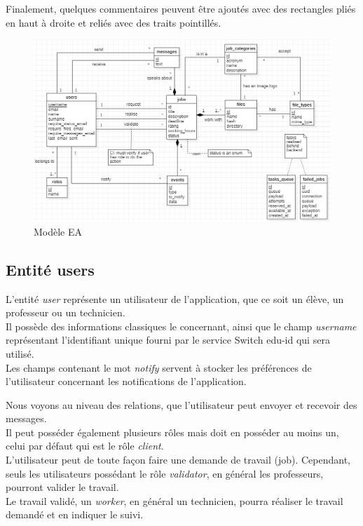 \documentclass[
    iai, %
    il, %
]{heig-tb}
\begin{document}
Finalement, quelques commentaires peuvent être ajoutés avec des rectangles pliés en haut à droite et reliés avec des traits pointillés.

\begin{center}
    \begin{figure}[H]
        \includegraphics[width=\textwidth]{./assets/figures/ea.png}
        \caption{Modèle EA \label{ea}}
    \end{figure}
\end{center}

\subsection{Entité users}
L'entité \emph{user} représente un utilisateur de l'application, que ce soit un élève, un professeur ou un technicien.\\
Il possède des informations classiques le concernant, ainsi que le champ \emph{username} représentant l'identifiant unique fourni par le service Switch edu-id qui sera utilisé.\\
Les champs contenant le mot \emph{notify} servent à stocker les préférences de l'utilisateur concernant les notifications de l'application.

Nous voyons au niveau des relations, que l'utilisateur peut envoyer et recevoir des messages.\\
Il peut posséder également plusieurs rôles mais doit en posséder au moins un, celui par défaut qui est le rôle \emph{client}.\\
L'utilisateur peut de toute façon faire une demande de travail (job). Cependant, seuls les utilisateurs possédant le rôle \emph{validator}, en général les professeurs, pourront valider le travail.\\
Le travail validé, un \emph{worker}, en général un technicien, pourra réaliser le travail demandé et en indiquer le suivi.
\end{document}
